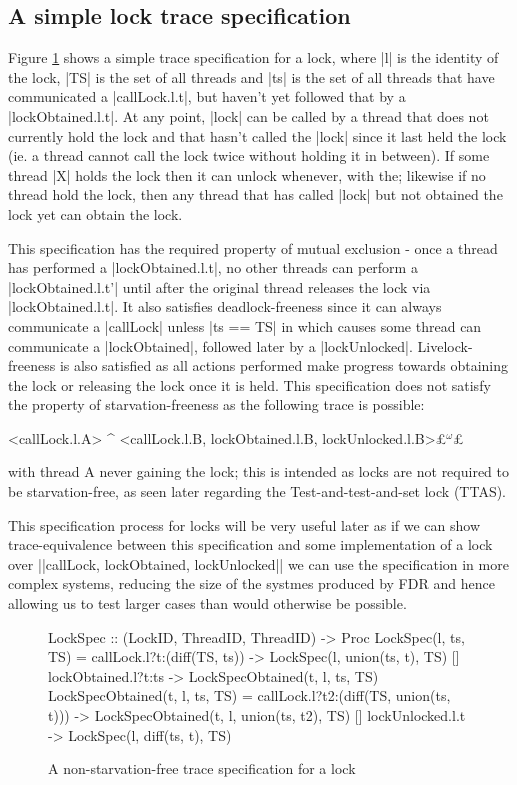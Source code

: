 \subsection{A simple lock trace specification}

Figure \ref{code:LockSpec} shows a simple trace specification for a lock, where |l| is the identity of the lock, |TS| is the set of all threads and |ts| is the set of all threads that have communicated a |callLock.l.t|, but haven't yet followed that by a |lockObtained.l.t|. At any point, |lock| can be called by a thread that does not currently hold the lock and that hasn't called the |lock| since it last held the lock (ie. a thread cannot call the lock twice without holding it in between). If some thread |X| holds the lock then it can unlock whenever, with the; likewise if no thread hold the lock, then any thread that has called |lock| but not obtained the lock yet can obtain the lock.

This specification has the required property of mutual exclusion - once a thread has performed a |lockObtained.l.t|, no other threads can perform a |lockObtained.l.t'| until after the original thread releases the lock via |lockObtained.l.t|. It also satisfies deadlock-freeness since it can always communicate a |callLock| unless |ts == TS| in which causes some thread can communicate a |lockObtained|, followed later by a |lockUnlocked|. Livelock-freeness is also satisfied as all actions performed make progress towards obtaining the lock or releasing the lock once it is held. This specification does not satisfy the property of starvation-freeness as the following trace is possible:
\begin{cspm}
  <callLock.l.A> ^ <callLock.l.B, lockObtained.l.B, lockUnlocked.l.B>£$^\omega$£
\end{cspm}
with thread A never gaining the lock; this is intended as locks are not required to be starvation-free, as seen later regarding the Test-and-test-and-set lock (TTAS).

This specification process for locks will be very useful later as if we can show trace-equivalence between this specification and some implementation of a lock over |{|callLock, lockObtained, lockUnlocked|}| we can use the specification in more complex systems, reducing the size of the systmes produced by FDR and hence allowing us to test larger cases than would otherwise be possible. 

\begin{figure}
\begin{cspm}
  LockSpec :: (LockID, {ThreadID}, {ThreadID}) -> Proc
  LockSpec(l, ts, TS) = callLock.l?t:(diff(TS, ts)) -> LockSpec(l, union(ts, {t}), TS)
                  [] lockObtained.l?t:ts -> LockSpecObtained(t, l, ts, TS)
  LockSpecObtained(t, l, ts, TS) = callLock.l?t2:(diff(TS, union(ts, {t}))) -> 
                                        LockSpecObtained(t, l, union(ts, {t2}), TS)
                  [] lockUnlocked.l.t -> LockSpec(l, diff(ts, {t}), TS)

\end{cspm}
\caption{A non-starvation-free trace specification for a lock}
\label{code:LockSpec}
\end{figure}

